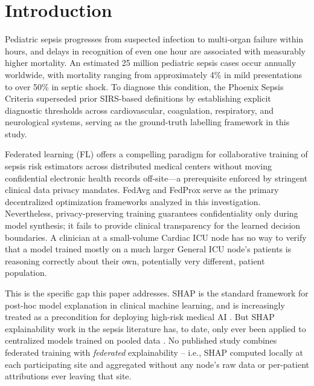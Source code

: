 \documentclass[conference]{IEEEtran}
\begin{document}
\section{Introduction}

Pediatric sepsis progresses from suspected infection to multi-organ failure
within hours, and delays in recognition of even one hour are associated with
measurably higher mortality. An estimated 25 million pediatric sepsis cases
occur annually worldwide, with mortality ranging from approximately 4\% in
mild presentations to over 50\% in septic shock. To diagnose this condition,
the Phoenix Sepsis Criteria \cite{sanchezpinto2024phoenix, schlapbach2024phoenix}
superseded prior SIRS-based definitions \cite{goldstein2005sirs} by establishing
explicit diagnostic thresholds across cardiovascular, coagulation, respiratory,
and neurological systems, serving as the ground-truth labelling framework in this study.

Federated learning (FL) offers a compelling paradigm for collaborative training
of sepsis risk estimators across distributed medical centers without moving
confidential electronic health records off-site---a prerequisite enforced by
stringent clinical data privacy mandates. FedAvg \cite{mcmahan2017fedavg} and
FedProx \cite{li2020fedprox} serve as the primary decentralized optimization
frameworks analyzed in this investigation. Nevertheless, privacy-preserving
training guarantees confidentiality only during model synthesis; it fails to
provide clinical transparency for the learned decision boundaries.
A clinician at a small-volume Cardiac ICU node has no way to verify that a
model trained mostly on a much larger General ICU node's patients is
reasoning correctly about their own, potentially very different, patient
population.

This is the specific gap this paper addresses. SHAP
\cite{lundberg2017shap} is the standard framework for post-hoc model
explanation in clinical machine learning, and is increasingly treated as a
precondition for deploying high-risk medical AI
\cite{athukorala2026explainable}. But SHAP explainability work in the
sepsis literature has, to date, only ever been applied to centralized
models trained on pooled data
\cite{chanci2025machine}. No published study combines federated training
with \emph{federated} explainability -- i.e., SHAP computed locally at each
participating site and aggregated without any node's raw data or
per-patient attributions ever leaving that site.
\end{document}
